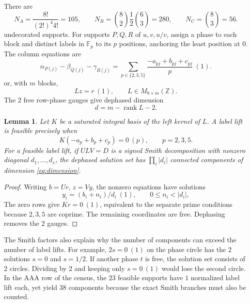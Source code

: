 \documentclass[11pt,a4paper]{article}
\newtheorem{lemma}[theorem]{Lemma}
\theoremstyle{plain}
\theoremstyle{definition}
\numberwithin{equation}{section}
\begin{document}
There are
$$
N_A=\frac{8!}{(2!)^4 4!}=105,\qquad
N_B=\binom82\frac12\binom63=280,\qquad
N_C=\binom83=56.
$$
undecorated supports. For supports $P,Q,R$ of $u,v,u/v$, assign a phase to each block and distinct labels in $\mathbb F_p$ to its $p$ positions, anchoring the least position at $0$. The column equations are
$$
\alpha_{P(j)}-\beta_{Q(j)}-\gamma_{R(j)}
=\sum_{p\in\{2,3,5\}}\frac{-a_{pj}+b_{pj}+c_{pj}}p\ (1).
$$
or, with $m$ blocks,
\begin{equation}\label{eq:phase}
Lz=r\ (1),\qquad L\in M_{8\times m}(\mathbb{Z}).
\end{equation}
The $2$ free row-phase gauges give dephased dimension
\begin{equation}\label{eq:dimension}
d=m-\operatorname{rank} L-2.
\end{equation}
\begin{lemma}
Let $K$ be a saturated integral basis of the left kernel of $L$. A label lift is feasible precisely when
$$K(-a_p+b_p+c_p)=0\ (p),\qquad p=2,3,5.$$
For a feasible label lift, if $ULV=D$ is a signed Smith decomposition with nonzero diagonal $d_1,\ldots,d_s$, the dephased solution set has $\prod_i|d_i|$ connected components of dimension \eqref{eq:dimension}.
\end{lemma}
\begin{proof}
Writing $b=Ur$, $z=Vy$, the nonzero equations have solutions
$$y_i=(b_i+n_i)/d_i\ (1),\qquad 0\le n_i<|d_i|,$$
The zero rows give $Kr=0\ (1)$, equivalent to the separate prime conditions because $2,3,5$ are coprime. The remaining coordinates are free. Dephasing removes the $2$ gauges.
\end{proof}
The Smith factors also explain why the number of components can exceed the number of label lifts. For example, $2s=0\ (1)$ on the phase circle has the $2$ solutions $s=0$ and $s=1/2$. If another phase $t$ is free, the solution set consists of $2$ circles. Dividing by $2$ and keeping only $s=0\ (1)$ would lose the second circle. In the AAA row of the census, the $23$ feasible supports have $1$ normalized label lift each, yet yield $38$ components because the exact Smith branches must also be counted.
\end{document}
